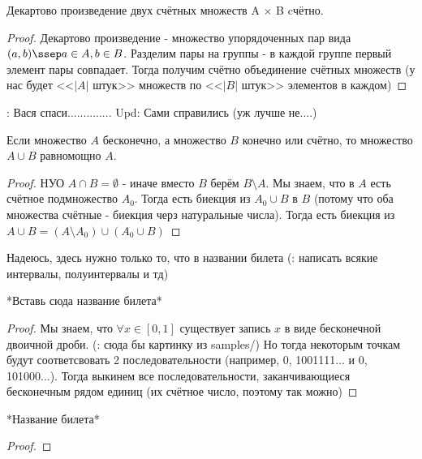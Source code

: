 \begin{theorem} \thmslashn

	Декартово произведение двух счётных множеств A × B cчётно.
	\begin{proof} \thmslashn
	
		Декартово произведение - множество упорядоченных пар вида $(a, b) \ssep a \in A, b \in B$.\newline
		Разделим пары на группы - в каждой группе первый элемент пары совпадает. Тогда получим счётно объединение счётных множеств (у нас будет <<$|A|$ штук>> множеств по <<$|B|$ штук>> элементов в каждом)
	\end{proof}
\end{theorem}


\TODO: Вася спаси.............. \newline
Upd: Сами справились (уж лучше не....) \newline

\begin{theorem} \thmslashn

	Если множество $A$ бесконечно, а множество $B$ конечно или счётно, то множество $A \cup B$ равномощно $A$.
	\begin{proof} \thmslashn
	
		НУО $A \cap B = \emptyset $ - иначе вместо $B$ берём $B \setminus A$. \newline
		Мы знаем, что в $A$ есть счётное подмножество $A_0$. Тогда есть биекция из $A_0 \cup B$ в $B$ (потому что оба множества счётные - биекция черз натуральные числа). Тогда есть биекция из $A \cup B = (A \setminus A_0) \cup (A_0 \cup B)$
	\end{proof}
\end{theorem}

Надеюсь, здесь нужно только то, что в названии билета (\TODO: написать всякие интервалы, полуинтервалы и тд)
\begin{theorem} \thmslashn

	*Вставь сюда название билета*
	\begin{proof} \thmslashn
	
		Мы знаем, что $\forall x \in [0,1]$ существует запись $x$ в виде бесконечной двоичной дроби. (\TODO: сюда бы картинку из samples/) Но тогда некоторым точкам будут соответсвовать 2 последовательности (например, 0, 1001111... и 0, 101000...). Тогда выкинем все последовательности, заканчивающиеся бесконечным рядом единиц (их счётное число, поэтому так можно)
	\end{proof}
\end{theorem}


\begin{theorem} \thmslashn

	*Название билета*
	\begin{proof} \thmslashn
	
		
	\end{proof}
\end{theorem}




